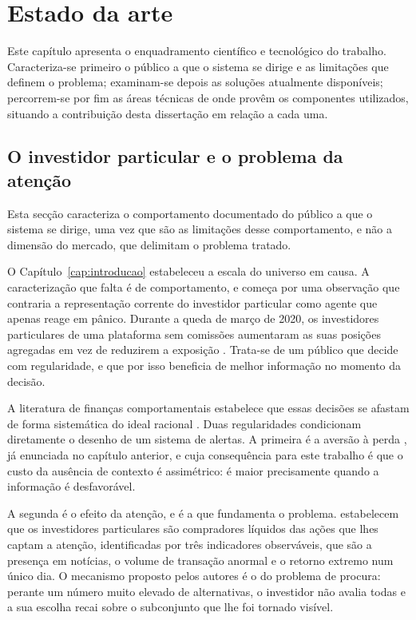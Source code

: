 \chapter{Estado da arte}
\label{cap:contexto}

Este capítulo apresenta o enquadramento científico e tecnológico do trabalho. Caracteriza-se
primeiro o público a que o sistema se dirige e as limitações que definem o problema; examinam-se
depois as soluções atualmente disponíveis; percorrem-se por fim as áreas técnicas de onde provêm
os componentes utilizados, situando a contribuição desta dissertação em relação a cada uma.

\section{O investidor particular e o problema da atenção}
\label{sec:ctx_investidor}

Esta secção caracteriza o comportamento documentado do público a que o sistema se dirige, uma vez
que são as limitações desse comportamento, e não a dimensão do mercado, que delimitam o problema
tratado.

O Capítulo~\ref{cap:introducao} estabeleceu a escala do universo em causa. A caracterização que
falta é de comportamento, e começa por uma observação que contraria a representação corrente do
investidor particular como agente que apenas reage em pânico. Durante a queda de março de 2020, os
investidores particulares de uma plataforma sem comissões aumentaram as suas posições agregadas em
vez de reduzirem a exposição \autocite{welch2022robinhood}. Trata-se de um público que decide com
regularidade, e que por isso beneficia de melhor informação no momento da decisão.

A literatura de finanças comportamentais estabelece que essas decisões se afastam de forma
sistemática do ideal racional \autocite{barberis2003behavioral}. Duas regularidades condicionam
diretamente o desenho de um sistema de alertas. A primeira é a aversão à perda
\autocite{kahneman1979prospect}, já enunciada no capítulo anterior, e cuja consequência para este
trabalho é que o custo da ausência de contexto é assimétrico: é maior precisamente quando a
informação é desfavorável.

A segunda é o efeito da atenção, e é a que fundamenta o problema. \textcite{barber2008glitters}
estabelecem que os investidores particulares são compradores líquidos das ações que lhes captam a
atenção, identificadas por três indicadores observáveis, que são a presença em notícias, o volume
de transação anormal e o retorno extremo num único dia. O mecanismo proposto pelos autores é o do
problema de procura: perante um número muito elevado de alternativas, o investidor não avalia todas
e a sua escolha recai sobre o subconjunto que lhe foi tornado visível.

